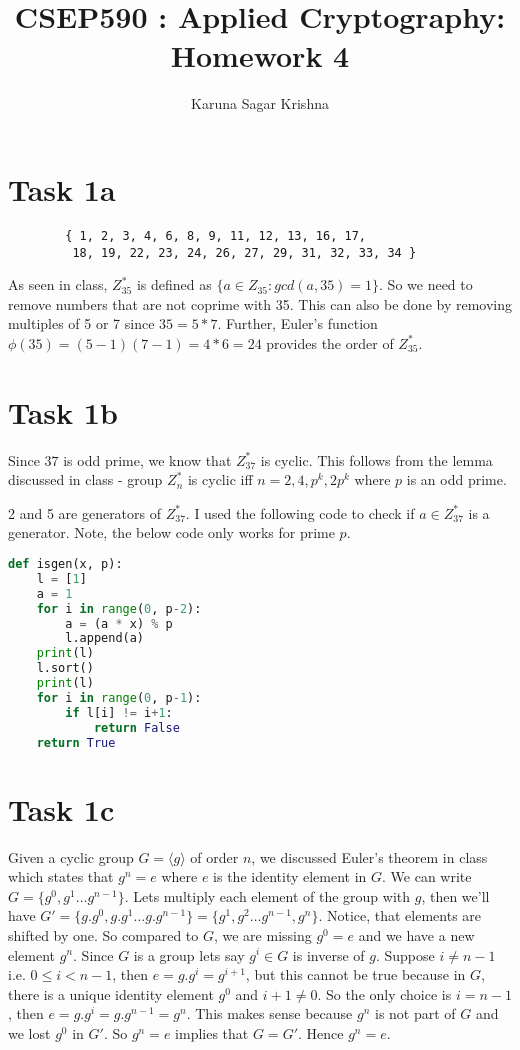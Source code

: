 \documentclass{article}
\title{CSEP590 : Applied Cryptography: Homework 4}
\author{Karuna Sagar Krishna}
\begin{document}
    \maketitle

    \section*{Task 1a}
    \begin{verbatim}
        { 1, 2, 3, 4, 6, 8, 9, 11, 12, 13, 16, 17, 
         18, 19, 22, 23, 24, 26, 27, 29, 31, 32, 33, 34 }
    \end{verbatim}

    As seen in class, $Z_{35}^*$ is defined as $\{ a \in Z_{35} : gcd(a, 35) = 1 \}$. So we need to remove numbers that are not coprime with 35. This can also be done by removing multiples of 5 or 7 since $35 = 5*7$. Further, Euler's function $\phi(35) = (5-1)(7-1) = 4*6 = 24$ provides the order of $Z_{35}^*$.

    \section*{Task 1b}
    Since $37$ is odd prime, we know that $Z_{37}^*$ is cyclic. This follows from the lemma discussed in class - group $Z_n^*$ is cyclic iff $n = 2, 4, p^k, 2p^k$ where $p$ is an odd prime.

    2 and 5 are generators of $Z_{37}^*$. I used the following code to check if $a \in Z_{37}^*$ is a generator. Note, the below code only works for prime $p$.

    \begin{lstlisting}[language=Python]
def isgen(x, p):
    l = [1]
    a = 1
    for i in range(0, p-2):
        a = (a * x) % p
        l.append(a)
    print(l)
    l.sort()
    print(l)
    for i in range(0, p-1):
        if l[i] != i+1:
            return False
    return True
    \end{lstlisting}

    \section*{Task 1c}
    Given a cyclic group $G = \langle g \rangle$ of order $n$, we discussed Euler's theorem in class which states that $g^n = e$ where $e$ is the identity element in $G$. We can write $G = \{ g^0, g^1 \dots g^{n-1} \}$. Lets multiply each element of the group with $g$, then we'll have $G' = \{ g.g^0, g.g^1 \dots g.g^{n-1} \} = \{g^1, g^2 \dots g^{n-1}, g^n\}$. Notice, that elements are shifted by one. So compared to $G$, we are missing $g^0 = e$ and we have a new element $g^n$. Since $G$ is a group lets say $g^i \in G$ is inverse of $g$. Suppose $i \ne n-1$ i.e. $0 \le i < n-1$, then $e = g.g^i = g^{i+1}$, but this cannot be true because in $G$, there is a unique identity element $g^0$ and $i+1 \ne 0$. So the only choice is $i = n-1$, then $e = g.g^i = g.g^{n-1} = g^n$. This makes sense because $g^n$ is not part of $G$ and we lost $g^0$ in $G'$. So $g^n = e$ implies that $G = G'$. Hence $g^n = e$.
\end{document}
